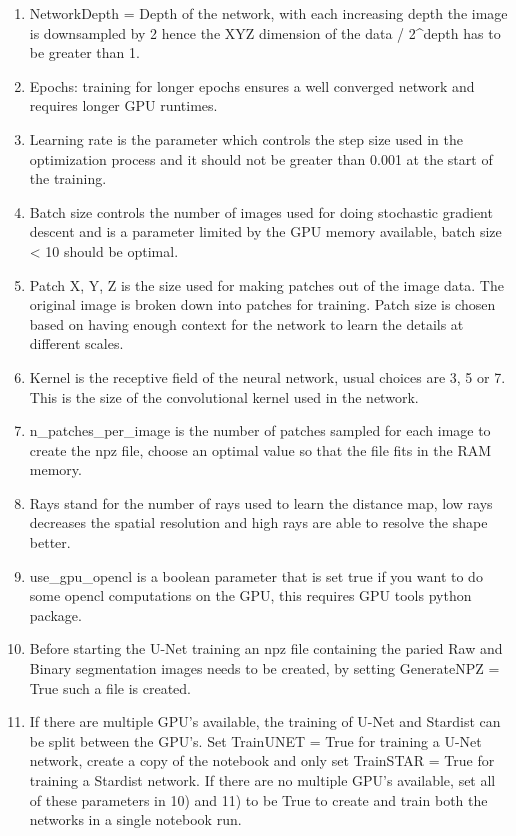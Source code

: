 \documentclass[letterpaper,compsoc,twoside,onecolumn]{IEEEtran}
\begin{document}
\begin{enumerate}
\renewcommand{\labelenumi}{\arabic{enumi})}
\item 

NetworkDepth = Depth of the network, with each increasing depth the image is downsampled by 2 hence the XYZ dimension of the data / 2\textasciicircum{}depth has to be greater than 1.
\item 

Epochs: training for longer epochs ensures a well converged network and requires longer GPU runtimes.
\item 

Learning rate is the parameter which controls the step size used in the optimization process and it should not be greater than 0.001 at the start of the training.
\item 

Batch size controls the number of images used for doing stochastic gradient descent and is a parameter limited by the GPU memory available, batch size < 10 should be optimal.
\item 

Patch X, Y, Z is the size used for making patches out of the image data. The original image is broken down into patches for training. Patch size is chosen based on having enough context for the network to learn the details at different scales.
\item 

Kernel is the receptive field of the neural network, usual choices are 3, 5 or 7. This is the size of the convolutional kernel used in the network.
\item 

n\_patches\_per\_image is the number of patches sampled for each image to create the npz file, choose an optimal value so that the file fits in the RAM memory.
\item 

Rays stand for the number of rays used to learn the distance map, low rays decreases the spatial resolution and high rays are able to resolve the shape better.
\item 

use\_gpu\_opencl is a boolean parameter that is set true if you want to do some opencl computations on the GPU, this requires GPU tools python package.
\item 

Before starting the U-Net training an npz file containing the paried Raw and Binary segmentation images needs to be created, by setting GenerateNPZ = True such a file is created.
\item 

If there are multiple GPU's available, the training of U-Net and Stardist can be split between the GPU's. Set TrainUNET = True  for training a U-Net network, create a copy of the notebook and only set TrainSTAR = True for training a Stardist network. If there are no multiple GPU's available, set all of these parameters in 10) and 11) to be True to create and train both the networks in a single notebook run.\end{enumerate}
\end{document}
